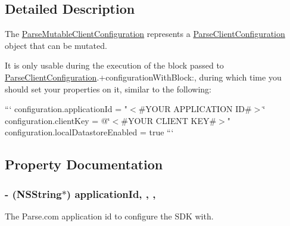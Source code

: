 \subsection{Detailed Description}
The {\ttfamily \hyperlink{protocol_parse_mutable_client_configuration-p}{Parse\+Mutable\+Client\+Configuration}} represents a {\ttfamily \hyperlink{interface_parse_client_configuration}{Parse\+Client\+Configuration}} object that can be mutated.

It is only usable during the execution of the block passed to {\ttfamily \hyperlink{interface_parse_client_configuration}{Parse\+Client\+Configuration}.+configuration\+With\+Block\+:}, during which time you should set your properties on it, similar to the following\+:

``` configuration.\+application\+Id = "$<$\#\+Y\+O\+U\+R A\+P\+P\+L\+I\+C\+A\+T\+I\+O\+N I\+D\#$>$\char`\"{}
configuration.\+client\+Key = @\char`\"{}$<$\#\+Y\+O\+U\+R C\+L\+I\+E\+N\+T K\+E\+Y\#$>$" configuration.\+local\+Datastore\+Enabled = true ``` 

\subsection{Property Documentation}
\hypertarget{protocol_parse_mutable_client_configuration-p_a26cbffdca27f76ffdfcc8e83ed056a8e}{}
\subsubsection[{application\+Id}]{\setlength{\rightskip}{0pt plus 5cm}-\/ (N\+S\+String$\ast$) application\+Id\hspace{0.3cm}{\ttfamily [read]}, {\ttfamily [write]}, {\ttfamily [nonatomic]}, {\ttfamily [copy]}}\label{protocol_parse_mutable_client_configuration-p_a26cbffdca27f76ffdfcc8e83ed056a8e}




 





The Parse.\+com application id to configure the S\+D\+K with. \hypertarget{protocol_parse_mutable_client_configuration-p_a6c73abadbf4fc85fe62e5e7477f0f78f}{}
